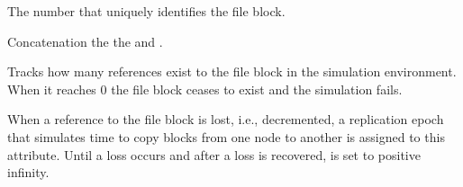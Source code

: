 \documentclass[letterpaper,10pt,english]{sphinxmanual}
\begin{document}
\begin{fulllineitems}

\begin{fulllineitems}
\label{\detokenize{app.domain.helpers:app.domain.helpers.smart_dataclasses.FileBlockData.number}}
The number that uniquely identifies the file block.

\end{fulllineitems}


\begin{fulllineitems}
\label{\detokenize{app.domain.helpers:app.domain.helpers.smart_dataclasses.FileBlockData.id}}
Concatenation the the  and .

\end{fulllineitems}


\begin{fulllineitems}
\label{\detokenize{app.domain.helpers:app.domain.helpers.smart_dataclasses.FileBlockData.references}}
Tracks how many references exist to the file block in the
simulation environment. When it reaches 0 the file block ceases
to exist and the simulation fails.

\end{fulllineitems}


\begin{fulllineitems}
\label{\detokenize{app.domain.helpers:app.domain.helpers.smart_dataclasses.FileBlockData.replication_epoch}}
When a reference to the file block is lost, i.e., decremented,
a replication epoch that simulates time to copy blocks from one
node to another is assigned to this attribute.
Until a loss occurs and after a loss is recovered,
 is set to positive infinity.

\end{fulllineitems}


\end{fulllineitems}
\end{document}
